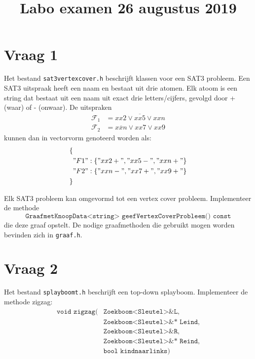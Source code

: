 \documentclass{article}
\title{Labo examen 26 augustus 2019}
\author{}
\begin{document}
    \maketitle 


    \section{Vraag 1}
    Het bestand \texttt{sat3vertexcover.h} beschrijft klassen voor een SAT3 probleem. Een SAT3 uitspraak heeft een naam en bestaat uit drie atomen. Elk atoom is een string dat bestaat uit een naam uit exact drie letters/cijfers, gevolgd door + (waar) of - (onwaar). De uitspraken
    \begin{align*}
        \mathcal{F}_1 &= xx2 \vee \overline{xx5} \vee xxn \\
        \mathcal{F}_2 &= \overline{xxn} \vee xx7 \vee xx9
    \end{align*}
    kunnen dan in vectorvorm genoteerd worden als:
    \begin{align*}
        \{& \\
         & "F1" : \{"xx2+", "xx5-", "xxn+"\} \\
         & "F2" : \{"xxn-", "xx7+", "xx9+"\} \\
        \}
    \end{align*}



    Elk SAT3 probleem kan omgevormd tot een vertex cover probleem. Implementeer de methode $$\texttt{GraafmetKnoopData<string> geefVertexCoverProbleem() const}$$
    die deze graaf opstelt. De nodige graafmethoden die gebruikt mogen worden bevinden zich in \texttt{graaf.h}.

    \section{Vraag 2}
    Het bestand \texttt{splayboomt.h} beschrijft een top-down splayboom. Implementeer de methode zigzag: 
    \begin{align*}
        \texttt{void zigzag(}&\texttt{Zoekboom<Sleutel>\& L,} \\
                            &\texttt{Zoekboom<Sleutel>\&* Leind,} \\
                            &\texttt{Zoekboom<Sleutel>\& R,} \\
                            &\texttt{Zoekboom<Sleutel>\&* Reind,} \\
                            &\texttt{bool kindnaarlinks})
    \end{align*}
\end{document}
